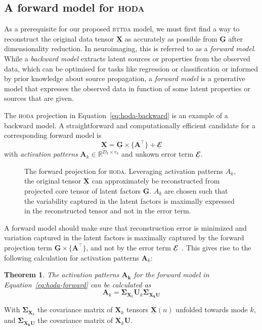 \documentclass[twocolumn]{article}
\newcommand{\ten}[1]{\underline{\mathbf{#1}}} %
\newcommand{\mat}[1]{\mathbf{#1}} %
\newcommand{\mmpr}[1]{\times\{#1\}} %
\newtheorem{theorem}{Theorem}
\begin{document}
\subsection{A forward model for \textsc{hoda}}
As a prerequisite for our proposed \textsc{bttda} model, we must first find a
way to reconstruct the original data tensor $\ten{X}$ as accurately as possible
from $\ten{G}$ after dimensionality reduction.
In neuroimaging, this is referred to as a \textit{forward model}.
While a \textit{backward model} extracts latent sources or properties from the observed
data, which can be optimised for tasks like regression or classification or
informed by prior knowledge about source propagation, a \textit{forward model} is a
generative model that expresses the observed data in function of some latent
properties or sources that are given.

The \textsc{hoda} projection in Equation~\ref{eq:hoda-backward} is an example
of a backward model.
A straightforward and computationally efficient candidate for a corresponding
forward model is
\begin{equation}
	\ten{X} = \ten{G}\mmpr{\mat{A}^\intercal} + \ten{\mathbfcal{E}}
	\label{eq:hoda-forward}
\end{equation}
with \textit{activation patterns} $\mat{A}_k \in \mathbb{R}^{D_k\times r_k}$
and unkown error term $\ten{\mathbfcal{E}}$.
\begin{figure}
	\centering
	
	\caption{The forward projection for \textsc{hoda}. Leveraging activation
		patterns $A_k$, the original tensor $\ten{X}$ can approximately be
		reconstructed from projected core tensor of latent factors $\ten{G}$. $A_k$ are chosen such
		that the variability captured in the latent factors is maximally expressed in
		the reconstructed tensor and not in the error term.}
	\label{fig:hoda-forward}
\end{figure}

A forward model should make sure that reconstruction error is minimized and
variation captured in the latent factors is maximally captured by the forward
projection term $\ten{G}\mmpr{\mat{A}^\intercal}$, and not by the error term
$\ten{\mathbfcal{E}}$~\cite{Haufe2014}.
This gives rise to the following calculation for activation patterns
$\mat{A}_k$:
\begin{theorem}
	The activation patterns $\mat{A_k}$ for the forward model in
	Equation~\ref{eq:hoda-forward} can be calculated as
	\begin{equation}
    \mat{A}_k = \mat{\Sigma}_{\mat{X}_k}\mat{U}_k\mat{\Sigma_{X_kU}}
		\label{eq:ap}
	\end{equation}
	\label{the:ap}
\end{theorem}
With $\mat{\Sigma}_{\mat{X}_k}$ the covariance matrix of $\mat{X}_k$ tensors $\ten{X}(n)$
unfolded towards mode $k$, and $\mat{\Sigma_{X_kU}}$  the covariance matrix of
$\mat{X}_k\mat{U}$.
\end{document}
